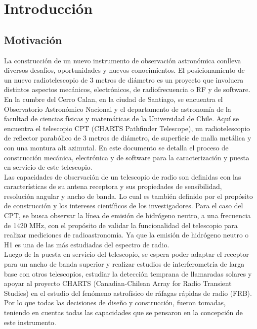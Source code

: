 \chapter{Introducción}
\section{Motivación}

La construcción de un nuevo instrumento de observación astronómica conlleva diversos desafíos, oportunidades y nuevos conocimientos. El posicionamiento de un nuevo radiotelescopio de 3 metros de diámetro es un proyecto que involucra distintos aspectos mecánicos, electrónicos, de radiofrecuencia o RF y de software.\\


En la cumbre del Cerro Calan, en la ciudad de Santiago, se encuentra el Observatorio Astronómico Nacional y el departamento de astronomía de la facultad de ciencias físicas y matemáticas de la Universidad de Chile. Aquí se encuentra el telescopio CPT (CHARTS Pathfinder Telescope), un radiotelescopio de reflector parabólico de 3 metros de diámetro, de superficie de malla metálica y con una montura alt azimutal. En este documento se detalla el proceso de construcción mecánica, electrónica y de software para la caracterización y puesta en servicio de este telescopio.\\ 

Las capacidades de observación de un telescopio de radio son definidas con las características de su antena receptora y sus propiedades de sensibilidad, resolución angular y ancho de banda. Lo cual es también definido por el propósito de construcción y los intereses científicos de los investigadores. Para el caso del CPT, se busca observar la línea de emisión de hidrógeno neutro, a una frecuencia de 1420 MHz, con el propósito de validar la funcionalidad del telescopio para realizar mediciones de radioastronomía. Ya que la emisión de hidrógeno neutro o H1 es una de las más estudiadas del espectro de radio.\\

Luego de la puesta en servicio del telescopio, se espera poder adaptar el receptor para un ancho de banda superior y realizar estudios de interferometría de larga base con otros telescopios, estudiar la detección temprana de llamaradas solares y apoyar al proyecto CHARTS (Canadian-Chilean Array for Radio Transient Studies) en el estudio del fenómeno astrofísico de ráfagas rápidas de radio (FRB). Por lo que todas las decisiones de diseño y construcción, fueron tomadas, teniendo en cuentas todas las capacidades que se pensaron en la concepción de este instrumento.\\

